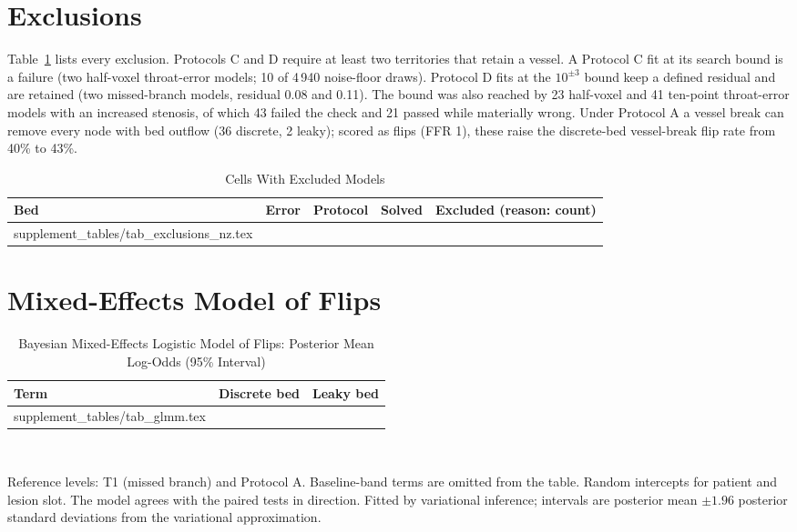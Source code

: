 \documentclass[journal,twoside,web,onecolumn]{ieeecolor}
\begin{document}
\FloatBarrier
{}
\section{Exclusions}
Table~\ref{tab:excl} lists every exclusion. Protocols C and D require at least two territories that retain a
vessel. A Protocol C fit at its search bound is a failure (two half-voxel throat-error models; 10 of 4\,940
noise-floor draws). Protocol D fits at the $10^{\pm 3}$ bound keep a defined residual and are retained (two missed-branch models, residual 0.08 and 0.11). The bound was also reached by 23 half-voxel and 41 ten-point throat-error models with an increased stenosis, of
which 43 failed the check and 21 passed while materially wrong.
Under Protocol A a vessel break can remove every node with bed outflow (36 discrete, 2 leaky); scored as flips (FFR 1),
these raise the discrete-bed vessel-break flip rate from 40\% to 43\%.
\begin{table}[!ht]
\caption{Cells With Excluded Models}\label{tab:excl}
\centering\footnotesize
\begin{tabular}{@{}lllrl@{}}
\toprule
Bed & Error & Protocol & Solved & Excluded (reason: count)\\
\midrule
{} supplement_tables/tab_exclusions_nz.tex 
\bottomrule
\end{tabular}
\end{table}

\FloatBarrier
{}
\section{Mixed-Effects Model of Flips}
\begin{table}[!ht]
\caption{Bayesian Mixed-Effects Logistic Model of Flips: Posterior Mean Log-Odds (95\% Interval)}\label{tab:glmm}
\centering\footnotesize
\begin{tabular}{@{}lcc@{}}
\toprule
Term & Discrete bed & Leaky bed\\
\midrule
{} supplement_tables/tab_glmm.tex 
\bottomrule
\end{tabular}
\\[3pt]
\parbox{0.85\textwidth}{\footnotesize Reference levels: T1 (missed branch) and Protocol A. Baseline-band terms are
omitted from the table. Random intercepts for patient and lesion slot. The model agrees with the paired tests in direction. Fitted by variational inference; intervals are
posterior mean $\pm 1.96$ posterior standard deviations from the variational approximation.}
\end{table}
\end{document}
